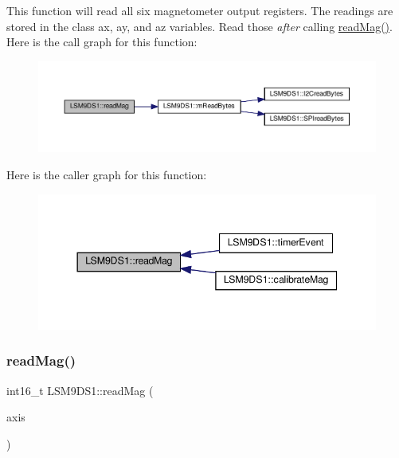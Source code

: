 This function will read all six magnetometer output registers. The readings are stored in the class\textquotesingle{} ax, ay, and az variables. Read those {\itshape after} calling \hyperlink{classLSM9DS1_ae127cf75aa5f3c5421e49363795dcd38}{read\+Mag()}. Here is the call graph for this function\+:
\nopagebreak
\begin{figure}[H]
\begin{center}
\leavevmode
\includegraphics[width=350pt]{classLSM9DS1_ae127cf75aa5f3c5421e49363795dcd38_cgraph}
\end{center}
\end{figure}
Here is the caller graph for this function\+:
\nopagebreak
\begin{figure}[H]
\begin{center}
\leavevmode
\includegraphics[width=344pt]{classLSM9DS1_ae127cf75aa5f3c5421e49363795dcd38_icgraph}
\end{center}
\end{figure}
\mbox{\label{classLSM9DS1_a615fd3ab32a9af833ef9899663100330}} 
\subsubsection{\texorpdfstring{read\+Mag()}{readMag()}\hspace{0.1cm}{\footnotesize\ttfamily [2/2]}}
{\footnotesize\ttfamily int16\+\_\+t L\+S\+M9\+D\+S1\+::read\+Mag (\begin{DoxyParamCaption}\item[{lsm9ds1\+\_\+axis}]{axis }\end{DoxyParamCaption})}



